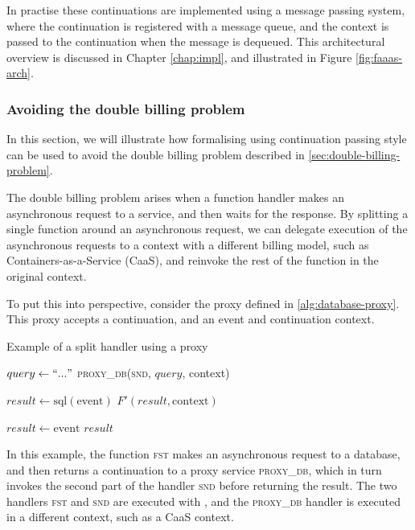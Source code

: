 In practise these continuations are implemented using a message passing system, where the continuation is registered with a message queue, and the context is passed to the continuation when the message is dequeued. This architectural overview is discussed in Chapter \ref{chap:impl}, and illustrated in Figure \ref{fig:faaas-arch}.

\subsubsection{Avoiding the double billing problem}
In this section, we will illustrate how formalising \faas{} using continuation passing style can be used to avoid the double billing problem described in \ref{sec:double-billing-problem}.

The double billing problem arises when a function handler makes an asynchronous request to a service, and then waits for the response. By splitting a single function around an asynchronous request, we can delegate execution of the asynchronous requests to a context with a different billing model, such as Containers-as-a-Service (CaaS), and reinvoke the rest of the function in the original \faas{} context.

To put this into perspective, consider the proxy defined in \ref{alg:database-proxy}. This proxy accepts a continuation, and an event and continuation context.

\begin{algorithm}
\caption{Example of a split handler using a proxy}
\label{alg:database-proxy}
\begin{algorithmic}[1]
    \State $query \gets ``..."$
    \State \Return \textsc{proxy_db}(\textsc{snd}, $query$, context)
\EndFunction

    \State $result \gets \textrm{sql}(\textrm{event})$
    \State \Return $F'(result, \textrm{context})$
\EndFunction

    \State $result \gets \textrm{event}$
    \State \Return $result$
\EndFunction
\end{algorithmic}
\end{algorithm}

In this example, the function \textsc{fst} makes an asynchronous request to a database, and then returns a continuation to a proxy service \textsc{proxy_db}, which in turn invokes the second part of the handler \textsc{snd} before returning the result. The two handlers \textsc{fst} and \textsc{snd} are executed with \faas{}, and the \textsc{proxy_db} handler is executed in a different context, such as a CaaS context.

